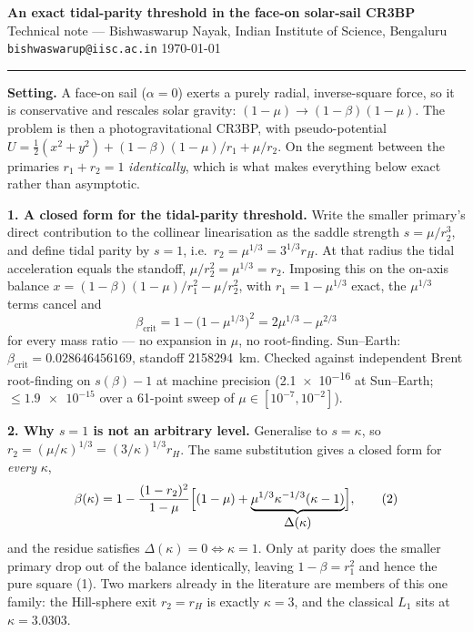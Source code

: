 \documentclass[11pt,a4paper]{article}
\begin{document}
\begin{center}
{\large\bfseries An exact tidal-parity threshold in the face-on solar-sail CR3BP}\\[2pt]
{\small Technical note --- Bishwaswarup Nayak, Indian Institute of Science, Bengaluru\\
\texttt{bishwaswarup@iisc.ac.in} \quad\textbullet\quad \today}
\end{center}
\vspace{-4pt}
\hrule
\vspace{6pt}

\noindent\textbf{Setting.} A face-on sail ($\alpha=0$) exerts a purely radial,
inverse-square force, so it is conservative and rescales solar gravity:
$(1-\mu)\to(1-\beta)(1-\mu)$. The problem is then a photogravitational CR3BP,
with pseudo-potential
$U=\tfrac12(x^2+y^2)+(1-\beta)(1-\mu)/r_1+\mu/r_2$.
On the segment between the primaries $r_1+r_2=1$ \emph{identically}, which is
what makes everything below exact rather than asymptotic.

\medskip
\noindent\textbf{1. A closed form for the tidal-parity threshold.}
Write the smaller primary's direct contribution to the collinear
linearisation as the saddle strength $s=\mu/r_2^3$, and define tidal parity by
$s=1$, i.e.\ $r_2=\mu^{1/3}=3^{1/3}r_H$. At that radius the tidal acceleration
equals the standoff, $\mu/r_2^2=\mu^{1/3}=r_2$. Imposing this on the on-axis
balance $x=(1-\beta)(1-\mu)/r_1^2-\mu/r_2^2$, with $r_1=1-\mu^{1/3}$ exact, the
$\mu^{1/3}$ terms cancel and
\begin{equation}
  \boxed{\;\beta_{\mathrm{crit}}=1-\bigl(1-\mu^{1/3}\bigr)^2=2\mu^{1/3}-\mu^{2/3}\;}
  \tag{1}
\end{equation}
for every mass ratio --- no expansion in $\mu$, no root-finding. Sun--Earth:
$\beta_{\mathrm{crit}}=0.028646456169$, standoff \SI{2158294}{\kilo\metre}.
Checked against independent Brent root-finding on $s(\beta)-1$ at machine
precision (\num{2.1e-16} at Sun--Earth; $\leq\num{1.9e-15}$ over a 61-point
sweep of $\mu\in[10^{-7},10^{-2}]$).

\medskip
\noindent\textbf{2. Why $s=1$ is not an arbitrary level.}
Generalise to $s=\kappa$, so $r_2=(\mu/\kappa)^{1/3}=(3/\kappa)^{1/3}r_H$. The
same substitution gives a closed form for \emph{every} $\kappa$,
\begin{equation}
  \beta(\kappa)=1-\frac{(1-r_2)^2}{1-\mu}\Bigl[(1-\mu)
  +\underbrace{\mu^{1/3}\kappa^{-1/3}(\kappa-1)}_{\textstyle\Delta(\kappa)}\Bigr],
  \tag{2}
\end{equation}
and the residue satisfies $\Delta(\kappa)=0 \iff \kappa=1$. Only at parity does
the smaller primary drop out of the balance identically, leaving
$1-\beta=r_1^2$ and hence the pure square (1). Two markers already in the
literature are members of this one family: the Hill-sphere exit
$r_2=r_H$ is exactly $\kappa=3$, and the classical $L_1$ sits at
$\kappa=3.0303$.
\end{document}
